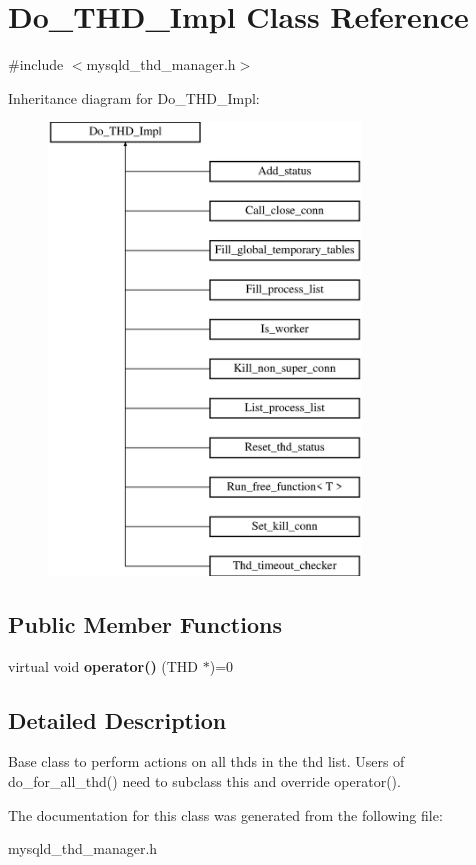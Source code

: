 \hypertarget{classDo__THD__Impl}{}\section{Do\+\_\+\+T\+H\+D\+\_\+\+Impl Class Reference}
\label{classDo__THD__Impl}


{\ttfamily \#include $<$mysqld\+\_\+thd\+\_\+manager.\+h$>$}

Inheritance diagram for Do\+\_\+\+T\+H\+D\+\_\+\+Impl\+:\begin{figure}[H]
\begin{center}
\leavevmode
\includegraphics[height=12.000000cm]{classDo__THD__Impl}
\end{center}
\end{figure}
\subsection*{Public Member Functions}
\begin{DoxyCompactItemize}
\item 
\mbox{\label{classDo__THD__Impl_aae6892880337628752d76d2439a4a43d}} 
virtual void {\bfseries operator()} (T\+HD $\ast$)=0
\end{DoxyCompactItemize}


\subsection{Detailed Description}
Base class to perform actions on all thds in the thd list. Users of do\+\_\+for\+\_\+all\+\_\+thd() need to subclass this and override operator(). 

The documentation for this class was generated from the following file\+:\begin{DoxyCompactItemize}
\item 
mysqld\+\_\+thd\+\_\+manager.\+h\end{DoxyCompactItemize}

